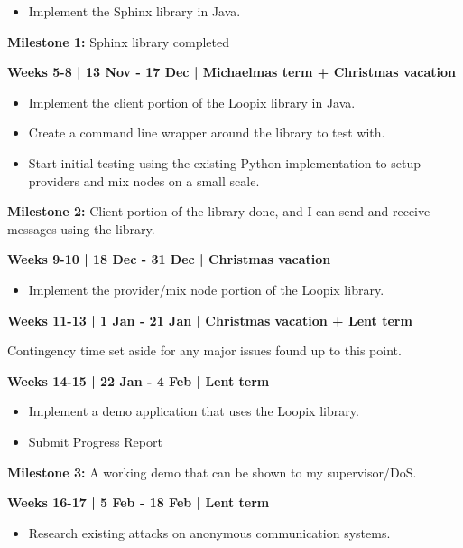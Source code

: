 \documentclass[12pt,a4paper,twoside]{article}
\begin{document}
	\begin{itemize}
		\item Implement the Sphinx library in Java.
	\end{itemize}
	
	\textbf{Milestone 1: }Sphinx library completed
	
	\textbf{Weeks 5-8 | 13 Nov - 17 Dec | Michaelmas term + Christmas vacation}
	
	\begin{itemize}
		\item Implement the client portion of the Loopix library in Java.
		\item Create a command line wrapper around the library to test with.
		\item Start initial testing using the existing Python implementation to setup providers and mix nodes on a small scale.
	\end{itemize}
	
	\textbf{Milestone 2:} Client portion of the library done, and I can send and receive messages using the library.
	
	\textbf{Weeks 9-10 | 18 Dec - 31 Dec | Christmas vacation}
	
	\begin{itemize}
		\item Implement the provider/mix node portion of the Loopix library.
	\end{itemize}
	
	\textbf{Weeks 11-13 | 1 Jan - 21 Jan | Christmas vacation + Lent term}
	
	Contingency time set aside for any major issues found up to this point.
	
	\textbf{Weeks 14-15 | 22 Jan - 4 Feb | Lent term}
	
	\begin{itemize}
		\item Implement a demo application that uses the Loopix library.
		\item Submit Progress Report
	\end{itemize}
	
	\textbf{Milestone 3:} A working demo that can be shown to my supervisor/DoS.
	
	\textbf{Weeks 16-17 | 5 Feb - 18 Feb | Lent term}
	
	\begin{itemize}
		\item Research existing attacks on anonymous communication systems.
	\end{itemize}
	
\end{document}
